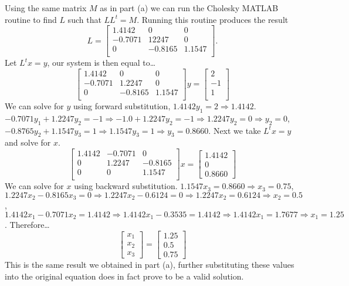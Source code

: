 \documentclass[10pt]{jhwhw}
\begin{document}
	Using the same matrix $M$ as in part (a) we can run the Cholesky MATLAB routine to find $L$ such that
	$LL^t = M$. Running this routine produces the result 
	$$
	L = \begin{bmatrix}
		1.4142 & 0 & 0 \\
		-0.7071 & 12247 & 0 \\
		0 & -0.8165 & 1.1547 \\
	\end{bmatrix}.
	$$
	Let $L^tx = y$, our system is then equal to\ldots
	$$
	\begin{bmatrix}
		1.4142 & 0 & 0 \\
		-0.7071 & 1.2247 & 0 \\
		0 & -0.8165 & 1.1547 \\
	\end{bmatrix}y = 
	\begin{bmatrix}
		2 \\ -1 \\ 1 \\
	\end{bmatrix}
	$$
	We can solve for $y$ using forward substitution, $1.4142y_1 = 2 \Rightarrow 1.4142$.
	$-0.7071y_1 + 1.2247y_2 = -1 \Rightarrow -1.0 + 1.2247y_2 = -1 \Rightarrow 1.2247y_2 = 0 \Rightarrow
	y_2 = 0$, $-0.8765y_2 + 1.1547y_3 = 1 \Rightarrow 1.1547y_3 = 1 \Rightarrow y_3 = 0.8660$. Next
	we take $L^tx=y$ and solve for $x$.
	$$
	\begin{bmatrix}
		1.4142 & -0.7071 & 0 \\
		0 & 1.2247 & -0.8165 \\
		0 & 0 & 1.1547 \\
	\end{bmatrix}x=
	\begin{bmatrix}
		1.4142 \\ 0 \\ 0.8660
	\end{bmatrix}
	$$
	We can solve for $x$ using backward substitution. $1.1547x_3 = 0.8660 \Rightarrow x_3 = 0.75$,
	$1.2247x_2 - 0.8165x_3 = 0 \Rightarrow 1.2247x_2 - 0.6124 = 0 \Rightarrow 1.2247x_2 = 0.6124 \Rightarrow
	x_2 = 0.5$, $1.4142x_1 - 0.7071x_2 = 1.4142 \Rightarrow 1.4142x_1 - 0.3535 = 1.4142 \Rightarrow
	1.4142x_1 = 1.7677 \Rightarrow x_1 = 1.25$. Therefore\ldots
	$$
	\begin{bmatrix}
		x_1 \\ x_2 \\ x_3
	\end{bmatrix} = 
	\begin{bmatrix}
		1.25 \\ 0.5 \\ 0.75
	\end{bmatrix}
	$$
	This is the same result we obtained in part (a), further substituting these values
	into the original equation does in fact prove to be a valid solution.

\end{document}
